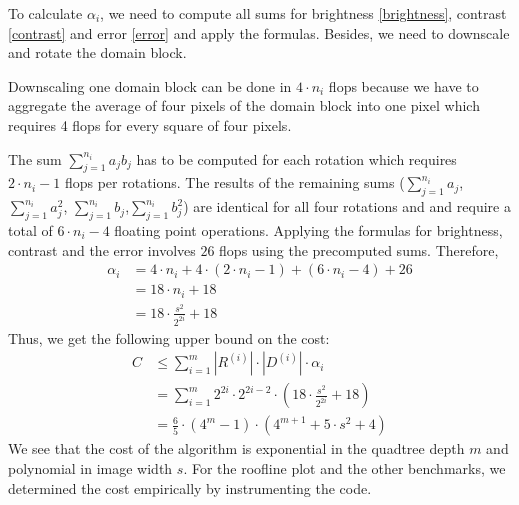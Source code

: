 To calculate $\alpha_{i}$, we need to compute all sums for brightness
\eqref{brightness}, contrast \eqref{contrast} and error \eqref{error} and apply
the formulas. Besides, we need to downscale and rotate the domain block.

Downscaling one domain block can be done in $4\cdot n_{i}$ flops because we have
to aggregate the average of four pixels of the domain block into one pixel which
requires 4 flops for every square of four pixels.

The sum $\sum_{j=1}^{n_{i}} a_j b_j$ has to be computed for each rotation which
requires $2\cdot n_{i}-1$ flops per rotations. The results of the remaining sums
($\sum_{j=1}^{n_{i}} a_j$, $\sum_{j=1}^{n_{i}} a_j^2$,
$\sum_{j=1}^{n_{i}} b_j$,$\sum_{j=1}^{n_{i}} b_j^2$) are identical for all four
rotations and and require a total of $6\cdot n_{i}-4$ floating point operations.
Applying the formulas for brightness, contrast and the error involves $26$ flops
using the precomputed sums. Therefore,
\begin{align*}
  \alpha_i &= 4\cdot n_{i} + 4 \cdot (2\cdot n_{i}-1) + (6\cdot n_{i}-4) +  26\\
           &= 18\cdot n_{i} + 18 \\
           &= 18 \cdot \frac{s^2}{2^{2i}} + 18
\end{align*}
Thus, we get the following upper bound on the cost:
\begin{align*}
C &\leq \sum_{i=1}^m |R^{(i)}| \cdot |D^{(i)}| \cdot \alpha_i \\
  &= \sum_{i=1}^m 2^{2i} \cdot 2^{2i-2} \cdot (18 \cdot \frac{s^2}{2^{2i}} + 18) \\
  &= \frac{6}{5}\cdot (4^{m}-1)\cdot (4^{m+1} + 5\cdot s^{2} + 4)
\end{align*}
We see that the cost of the algorithm is exponential in the quadtree depth $m$
and polynomial in image width $s$. For the roofline plot and the other benchmarks,
we determined the cost empirically by instrumenting the code.
